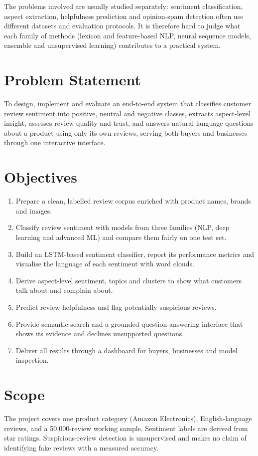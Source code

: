 \documentclass[12pt,a4paper]{report}
\begin{document}
The problems involved are usually studied separately: sentiment classification, aspect extraction, helpfulness prediction and opinion-spam detection often use different datasets and evaluation protocols. It is therefore hard to judge what each family of methods (lexicon and feature-based NLP, neural sequence models, ensemble and unsupervised learning) contributes to a practical system.

\section{Problem Statement}
To design, implement and evaluate an end-to-end system that classifies customer review sentiment into positive, neutral and negative classes, extracts aspect-level insight, assesses review quality and trust, and answers natural-language questions about a product using only its own reviews, serving both buyers and businesses through one interactive interface.

\section{Objectives}
\begin{enumerate}
\item Prepare a clean, labelled review corpus enriched with product names, brands and images.
\item Classify review sentiment with models from three families (NLP, deep learning and advanced ML) and compare them fairly on one test set.
\item Build an LSTM-based sentiment classifier, report its performance metrics and visualise the language of each sentiment with word clouds.
\item Derive aspect-level sentiment, topics and clusters to show what customers talk about and complain about.
\item Predict review helpfulness and flag potentially suspicious reviews.
\item Provide semantic search and a grounded question-answering interface that shows its evidence and declines unsupported questions.
\item Deliver all results through a dashboard for buyers, businesses and model inspection.
\end{enumerate}

\section{Scope}
The project covers one product category (Amazon Electronics), English-language reviews, and a 50,000-review working sample. Sentiment labels are derived from star ratings. Suspicious-review detection is unsupervised and makes no claim of identifying fake reviews with a measured accuracy.
\end{document}
